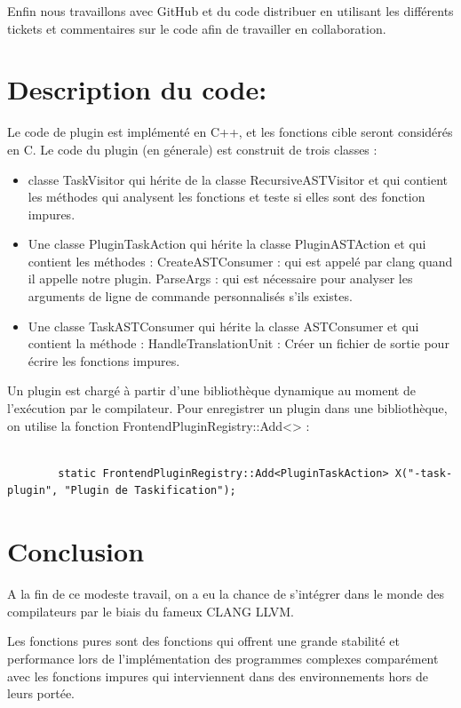 \documentclass[12pt,titlepage]{article}
\begin{document}
Enfin nous travaillons avec GitHub et du code distribuer en utilisant les différents tickets et commentaires sur le code afin de travailler en collaboration.


\section {Description du code:}
Le code de plugin est implémenté en C++, et les fonctions cible seront considérés en C. 
Le code du plugin (en génerale) est construit de trois classes :
\begin{itemize}


 	\item classe TaskVisitor qui hérite de la classe RecursiveASTVisitor et qui contient les méthodes qui analysent les fonctions et teste si elles sont des fonction impures.

	\item Une classe PluginTaskAction qui hérite la classe PluginASTAction et qui contient les méthodes :
		CreateASTConsumer : qui est appelé par clang quand il appelle notre plugin.
		ParseArgs : qui est nécessaire pour analyser les arguments de ligne de commande personnalisés s'ils existes.

     \item Une classe TaskASTConsumer qui hérite la classe ASTConsumer et qui contient la méthode :
     	HandleTranslationUnit : Créer un fichier de sortie pour écrire les fonctions impures.
\end{itemize}
     
    Un plugin est chargé à partir d'une bibliothèque dynamique au moment de l'exécution par le compilateur. Pour enregistrer un plugin dans une bibliothèque, on utilise la fonction FrontendPluginRegistry::Add<> :
\begin{lstlisting}

 		static FrontendPluginRegistry::Add<PluginTaskAction> X("-task-plugin", "Plugin de Taskification");

\end{lstlisting}

\pagebreak
\section*{Conclusion}

A la fin de ce modeste travail, on a eu la chance de s'intégrer dans le monde des compilateurs par le biais du fameux CLANG LLVM.

Les fonctions pures sont des fonctions qui offrent une grande stabilité et performance lors de l'implémentation des programmes complexes comparément avec les fonctions impures qui interviennent dans des environnements hors de leurs portée.
\end{document}
